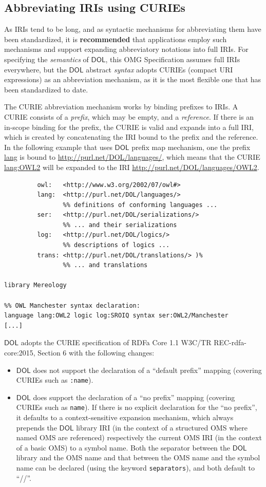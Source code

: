 \documentclass[10pt,fleqn,final]{scrreprt}
\makeatletter
\newcommand*\CommentAuthor{}
\renewcommand*\CommentAuthor{#1}}
\newcommand*\CommentDate{}
\renewcommand*\CommentDate{#1}}
\newcommand*\CommentId{}
\renewcommand*\CommentId{#1}}
\newcommand*\CommentType{}
\renewcommand*\CommentType{#1}}
\newcommand*{\SetCommentColorByType}[1]{%
\edef\localType{{#1}}%
\expandafter\ifstrequal\localType{q-aut}{\colorlet{CommentColor}{red}}{%
\expandafter\ifstrequal\localType{q-all}{\colorlet{CommentColor}{orange}}{%
\expandafter\ifstrequal\localType{todo}{\colorlet{CommentColor}{orange}}{%
\expandafter\ifstrequal\localType{fyi}{\colorlet{CommentColor}{lightgray}}{%
\colorlet{CommentColor}{yellow}}}}}}
\newcommand*{\SetCommentPrefixByType}[1]{%
\edef\localType{{#1}}%
\expandafter\@ifmtarg\localType{%
\edef\CommentPrefix{}%
}{%
\caseupper[q]{#1}%
\edef\CommentPrefix{\thestring: }%
}}
\newcommand*{\initComment}[1]{%
\setkeys{Comment}{#1}%
\SetCommentColorByType{\CommentType}%
\relax%
\SetCommentPrefixByType{\CommentType}%
\relax%
}
\newcommand*{\todonote}[2][]{%
\initComment{#1}%
\pdfcomment[author=\CommentAuthor,color=CommentColor,date=\CommentDate,id=\CommentId]{%
\CommentPrefix
#2}}
\renewcommand*{\todonote}[2][]{%
\initComment{#1}%
\ednote{\CommentPrefix #2}}
\newcommand*{\CLnote}[2][author=Christoph Lange]{%
\todonote[author=Christoph Lange,#1]{#2} 
}
\newcommand*{\syntax}[1]{\texttt{#1}}
\newcommand*{\recommended}{\textbf{recommended}\xspace}
\newcommand*{\IS}{OMG Specification\xspace}
\newcommand*{\DOL}{\ensuremath{\mathsf{DOL}}\xspace}
\newcommand{\ssclause}[1]{\subsection{#1}}
\newcommand{\nisref}[1]{#1}
\newenvironment{definitions}[0]{\medskip }{}
\makeatother
\begin{document}
\begin{definitions}
%
\ssclause{Abbreviating IRIs using CURIEs}\label{c:curies}

As IRIs tend to be long, and as syntactic mechanisms for abbreviating them have been standardized, 
it is \recommended that applications employ such mechanisms and support expanding abbreviatory
notations into full IRIs.  For specifying the \emph{semantics} of \DOL, this \IS assumes full IRIs 
everywhere, but the \DOL abstract \emph{syntax} adopts CURIEs (compact URI expressions) as an 
abbreviation mechanism, as it is the most flexible one that has been standardized to date.  

The CURIE abbreviation mechanism works by binding prefixes to IRIs.  A CURIE consists of a 
\emph{prefix}, which may be empty, and a \emph{reference}.  If there is an in-scope binding for the 
prefix, the CURIE is valid and expands into a full IRI, which is created by concatenating the IRI 
bound to the prefix and the reference.  In the following example that uses \DOL prefix map mechanism, one the prefix \url{lang} is bound to \url{http://purl.net/DOL/languages/}, which
means that the CURIE \url{lang:OWL2} will be expanded to the IRI
\url{http://purl.net/DOL/languages/OWL2}.

\begin{lstlisting}[basicstyle=\ttfamily,language=dolText,escapechar=@,mathescape]
%prefix( :      <http://www.example.org/mereology#>
         owl:   <http://www.w3.org/2002/07/owl#>
         lang:  <http://purl.net/DOL/languages/>
                %% definitions of conforming languages ...
         ser:   <http://purl.net/DOL/serializations/>
                %% ... and their serializations
         log:   <http://purl.net/DOL/logics/>
                %% descriptions of logics ...
         trans: <http://purl.net/DOL/translations/> )%
                %% ... and translations

library Mereology

%% OWL Manchester syntax declaration: 
language lang:OWL2 logic log:SROIQ syntax ser:OWL2/Manchester
[...]
\end{lstlisting}


\DOL adopts the CURIE specification of RDFa Core 1.1 \nisref{W3C/TR REC-rdfa-core:2015, Section 6} with the following changes:
\begin{itemize}
\item \DOL does not support the declaration of a ``default prefix'' mapping %
(covering CURIEs such as \syntax{:name}).
\item \DOL does support the declaration  of a ``no prefix'' mapping (covering CURIEs such as 
\syntax{name}). If there is no explicit declaration for the ``no prefix'', it defaults to a 
context-sensitive expansion mechanism, which always prepends the \DOL library IRI (in the context of a 
structured OMS where named OMS are referenced) respectively the current OMS IRI (in the context of a basic
OMS) to a symbol name. Both the separator between the \DOL library and the OMS name and that between the 
OMS name and the symbol name can be declared (using the keyword \syntax{separators}), and both default to ``//''.


\end{itemize}
\end{definitions}
\end{document}
